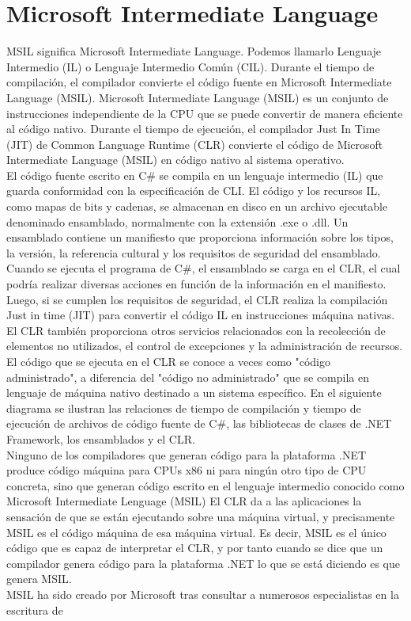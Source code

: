\documentclass[12pt,a4paper]{report}
\begin{document}
\section{Microsoft Intermediate Language}
MSIL significa Microsoft Intermediate Language. Podemos llamarlo Lenguaje Intermedio (IL) o Lenguaje Intermedio Común (CIL). Durante el tiempo de compilación, el compilador convierte el código fuente en Microsoft Intermediate Language (MSIL). Microsoft Intermediate Language (MSIL) es un conjunto de instrucciones independiente de la CPU que se puede convertir de manera eficiente al código nativo. Durante el tiempo de ejecución, el compilador Just In Time (JIT) de Common Language Runtime (CLR) convierte el código de Microsoft Intermediate Language (MSIL) en código nativo al sistema operativo.\\El código fuente escrito en C\# se compila en un lenguaje intermedio (IL) que guarda conformidad con la especificación de CLI. El código y los recursos IL, como mapas de bits y cadenas, se almacenan en disco en un archivo ejecutable denominado ensamblado, normalmente con la extensión .exe o .dll. Un ensamblado contiene un manifiesto que proporciona información sobre los tipos, la versión, la referencia cultural y los requisitos de seguridad del ensamblado.\\Cuando se ejecuta el programa de C\#, el ensamblado se carga en el CLR, el cual podría realizar diversas acciones en función de la información en el manifiesto. Luego, si se cumplen los requisitos de seguridad, el CLR realiza la compilación Just in time (JIT) para convertir el código IL en instrucciones máquina nativas. El CLR también proporciona otros servicios relacionados con la recolección de elementos no utilizados, el control de excepciones y la administración de recursos. El código que se ejecuta en el CLR se conoce a veces como "código administrado", a diferencia del "código no administrado" que se compila en lenguaje de máquina nativo destinado a un sistema específico. En el siguiente diagrama se ilustran las relaciones de tiempo de compilación y tiempo de ejecución de archivos de código fuente de C\#, las bibliotecas de clases de .NET Framework, los ensamblados y el CLR.\\Ninguno de los compiladores que generan código para la plataforma .NET produce código máquina para CPUs x86 ni para ningún otro tipo de CPU concreta, sino que generan código escrito en el lenguaje intermedio conocido como Microsoft Intermediate Lenguage (MSIL) El CLR da a las aplicaciones la sensación de que se están ejecutando sobre una máquina virtual, y precisamente MSIL es el código máquina de esa máquina virtual. Es decir, MSIL es el único código que es capaz de interpretar el CLR, y por tanto cuando se dice que un compilador genera código para la plataforma .NET lo que se está diciendo es que genera MSIL.\\MSIL ha sido creado por Microsoft tras consultar a numerosos especialistas en la escritura de 
\end{document}
